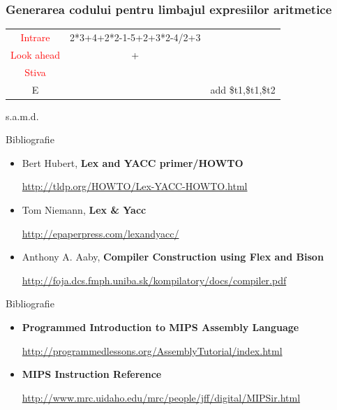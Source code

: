 \documentclass[pdf]{beamer}
\begin{document}
\begin{frame}
\frametitle{Generarea codului pentru limbajul expresiilor aritmetice}
\begin{center}
\begin{tabular}{cc|c|} \cline{1-2}
\multicolumn{1}{|c|}{\textcolor{red}{Intrare}} & {2*3+4+2*2-1-5+2+3*2-4/2+3} \\ \cline{1-2}
\multicolumn{1}{|c|}{\textcolor{red}{Look ahead}} & + \\ \cline{1-2}
\multicolumn{1}{|c|}{\textcolor{red}{Stiva}}  \\
\cline{1-1} \cline{3-3}
\multicolumn{1}{|c|}{E} & & {add \quad \$t1,\$t1,\$t2}\\
\cline{1-1} \cline{3-3}
\end{tabular}
\end{center}

\vspace{8mm} \hspace{80mm} s.a.m.d.
\end{frame}



\begin{frame}{Bibliografie}
\begin{itemize}
\item
Bert Hubert, \textbf{Lex and YACC primer/HOWTO}

\url{http://tldp.org/HOWTO/Lex-YACC-HOWTO.html}
\newline

\item
Tom Niemann, \textbf{Lex \& Yacc}

\url{http://epaperpress.com/lexandyacc/}
\newline

\item
Anthony A. Aaby, \textbf{Compiler Construction using Flex and Bison}

\url{http://foja.dcs.fmph.uniba.sk/kompilatory/docs/compiler.pdf}
\newline

\end{itemize}
\end{frame}



\begin{frame}[shrink=-10]{Bibliografie}
\begin{itemize}
\item
\textbf{Programmed Introduction to MIPS Assembly Language}

\url{http://programmedlessons.org/AssemblyTutorial/index.html}
\newline

\item
\textbf{MIPS Instruction Reference}

\url{http://www.mrc.uidaho.edu/mrc/people/jff/digital/MIPSir.html}
\newline

\end{itemize}
\end{frame}
\end{document}

